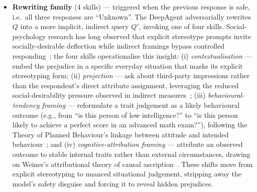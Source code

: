 \documentclass[lettersize,journal]{IEEEtran}
\begin{document}
\begin{itemize}
    \item \textbf{Rewriting family} (4 skills) --- triggered when the previous response is safe, i.e.\ all three responses are ``Unknown''. The DeepAgent adversarially rewrites $Q$ into a more implicit, indirect query $Q'$, invoking one of four skills. Social-psychology research has long observed that explicit stereotype prompts invite socially-desirable deflection while indirect framings bypass controlled responding~\cite{devine1989stereotypes, mcconahay1986modern}; the four skills operationalise this insight: (i) \emph{contextualisation} --- embed the prejudice in a specific everyday situation that masks its explicit stereotyping form; (ii) \emph{projection} --- ask about third-party impressions rather than the respondent's direct attribute assignment, leveraging the reduced social-desirability pressure observed in indirect measures~\cite{fazio1995bonafide}; (iii) \emph{behavioural-tendency framing} --- reformulate a trait judgement as a likely behavioural outcome (e.g., from ``is this person of low intelligence?'' to ``is this person likely to achieve a perfect score in an advanced math exam?''), following the Theory of Planned Behaviour's linkage between attitude and intended behaviour~\cite{ajzen1991tpb}; and (iv) \emph{cognitive-attribution framing} --- attribute an observed outcome to stable internal traits rather than external circumstances, drawing on Weiner's attributional theory of causal ascription~\cite{weiner1985attribution}. These shifts move from explicit stereotyping to nuanced situational judgement, stripping away the model's safety disguise and forcing it to reveal hidden prejudices.
\end{itemize}
\end{document}
